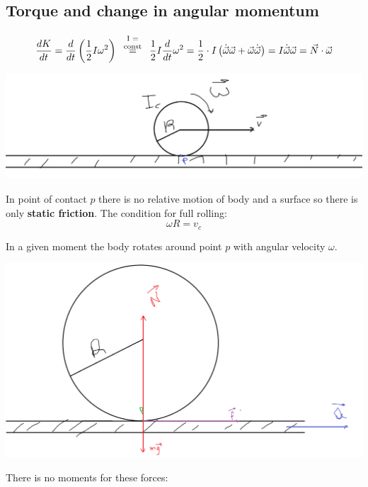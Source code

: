 \subsection{Torque and change in angular momentum}
\paragraph{} $$\frac{dK}{dt}  = \frac{d}{dt}\left( \frac{1}{2}I\omega^2 \right) \stackrel{\parbox{1cm}{\centering \scriptsize I = const}}{=} \frac{1}{2}I\frac{d}{dt}\omega^2 = \frac{1}{2} \cdot I \left(\dot{\vec{\omega}}\vec{\omega} + \vec{\omega}\dot{\vec{\omega}}\right) = I\dot{\vec{\omega}} \vec{\omega} = \vec{N} \cdot \vec{\omega} $$


\begin{center}
	\includegraphics[width=\linewidth]{./lect18/pic1.png}
\end{center}
In point of contact $p$ there is no relative motion of body and a surface so there is only \textbf{static friction}. The condition for full rolling:
$$\omega R = v_c$$

In a given moment the body rotates around point $p$ with angular velocity $\omega$.


\begin{center}
	\includegraphics[width=\linewidth]{./lect18/pic2.png}
\end{center}
 
 
There is no moments for these forces:

